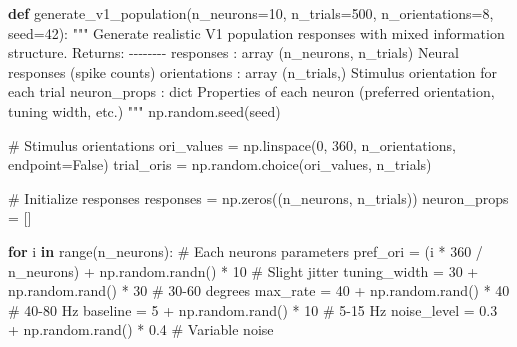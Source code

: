 \documentclass[
  11pt,
  letterpaper,
  oneside,
  openany]{book}
\newenvironment{Shaded}{\begin{snugshade}}{\end{snugshade}}
\newcommand{\BuiltInTok}[1]{\textcolor[rgb]{0.00,0.23,0.31}{#1}}
\newcommand{\CommentTok}[1]{\textcolor[rgb]{0.37,0.37,0.37}{#1}}
\newcommand{\ControlFlowTok}[1]{\textcolor[rgb]{0.00,0.23,0.31}{\textbf{#1}}}
\newcommand{\DecValTok}[1]{\textcolor[rgb]{0.68,0.00,0.00}{#1}}
\newcommand{\FloatTok}[1]{\textcolor[rgb]{0.68,0.00,0.00}{#1}}
\newcommand{\KeywordTok}[1]{\textcolor[rgb]{0.00,0.23,0.31}{\textbf{#1}}}
\newcommand{\NormalTok}[1]{\textcolor[rgb]{0.00,0.23,0.31}{#1}}
\newcommand{\OperatorTok}[1]{\textcolor[rgb]{0.37,0.37,0.37}{#1}}
\newcommand{\VariableTok}[1]{\textcolor[rgb]{0.07,0.07,0.07}{#1}}
\begin{document}
\begin{Shaded}
\begin{Highlighting}[]
\KeywordTok{def}\NormalTok{ generate\_v1\_population(n\_neurons}\OperatorTok{=}\DecValTok{10}\NormalTok{, n\_trials}\OperatorTok{=}\DecValTok{500}\NormalTok{, n\_orientations}\OperatorTok{=}\DecValTok{8}\NormalTok{, seed}\OperatorTok{=}\DecValTok{42}\NormalTok{):}
    \CommentTok{"""}
\CommentTok{    Generate realistic V1 population responses with mixed information structure.}
\CommentTok{    }
\CommentTok{    Returns:}
\CommentTok{    {-}{-}{-}{-}{-}{-}{-}{-}}
\CommentTok{    responses : array (n\_neurons, n\_trials)}
\CommentTok{        Neural responses (spike counts)}
\CommentTok{    orientations : array (n\_trials,)}
\CommentTok{        Stimulus orientation for each trial}
\CommentTok{    neuron\_props : dict}
\CommentTok{        Properties of each neuron (preferred orientation, tuning width, etc.)}
\CommentTok{    """}
\NormalTok{    np.random.seed(seed)}
    
    \CommentTok{\# Stimulus orientations}
\NormalTok{    ori\_values }\OperatorTok{=}\NormalTok{ np.linspace(}\DecValTok{0}\NormalTok{, }\DecValTok{360}\NormalTok{, n\_orientations, endpoint}\OperatorTok{=}\VariableTok{False}\NormalTok{)}
\NormalTok{    trial\_oris }\OperatorTok{=}\NormalTok{ np.random.choice(ori\_values, n\_trials)}
    
    \CommentTok{\# Initialize responses}
\NormalTok{    responses }\OperatorTok{=}\NormalTok{ np.zeros((n\_neurons, n\_trials))}
\NormalTok{    neuron\_props }\OperatorTok{=}\NormalTok{ []}
    
    \ControlFlowTok{for}\NormalTok{ i }\KeywordTok{in} \BuiltInTok{range}\NormalTok{(n\_neurons):}
        \CommentTok{\# Each neuron\textquotesingle{}s parameters}
\NormalTok{        pref\_ori }\OperatorTok{=}\NormalTok{ (i }\OperatorTok{*} \DecValTok{360} \OperatorTok{/}\NormalTok{ n\_neurons) }\OperatorTok{+}\NormalTok{ np.random.randn() }\OperatorTok{*} \DecValTok{10}  \CommentTok{\# Slight jitter}
\NormalTok{        tuning\_width }\OperatorTok{=} \DecValTok{30} \OperatorTok{+}\NormalTok{ np.random.rand() }\OperatorTok{*} \DecValTok{30}  \CommentTok{\# 30{-}60 degrees}
\NormalTok{        max\_rate }\OperatorTok{=} \DecValTok{40} \OperatorTok{+}\NormalTok{ np.random.rand() }\OperatorTok{*} \DecValTok{40}  \CommentTok{\# 40{-}80 Hz}
\NormalTok{        baseline }\OperatorTok{=} \DecValTok{5} \OperatorTok{+}\NormalTok{ np.random.rand() }\OperatorTok{*} \DecValTok{10}  \CommentTok{\# 5{-}15 Hz}
\NormalTok{        noise\_level }\OperatorTok{=} \FloatTok{0.3} \OperatorTok{+}\NormalTok{ np.random.rand() }\OperatorTok{*} \FloatTok{0.4}  \CommentTok{\# Variable noise}
        

\end{Highlighting}
\end{Shaded}
\end{document}

